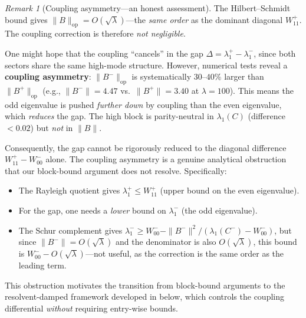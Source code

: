 \documentclass[12pt,a4paper]{article}
\theoremstyle{definition}
\theoremstyle{remark}
\newtheorem{remark}[theorem]{Remark}
\begin{document}
\begin{remark}[Coupling asymmetry---an honest assessment]
\label{rem:coupling-revisited}
The Hilbert--Schmidt bound gives $\|B\|_{\mathrm{op}} = O(\sqrt{\lambda})$---the \emph{same order} as the dominant diagonal $W_{11}^+$. The coupling correction is therefore \emph{not negligible}.

One might hope that the coupling ``cancels'' in the gap $\Delta = \lambda_1^+ - \lambda_1^-$, since both sectors share the same high-mode structure. However, numerical tests reveal a \textbf{coupling asymmetry}: $\|B^-\|_{\mathrm{op}}$ is systematically $30$--$40\%$ larger than $\|B^+\|_{\mathrm{op}}$ (e.g., $\|B^-\| = 4.47$ vs.\ $\|B^+\| = 3.40$ at $\lambda = 100$). This means the odd eigenvalue is pushed \emph{further down} by coupling than the even eigenvalue, which \emph{reduces} the gap. The high block is parity-neutral in $\lambda_1(C)$ (difference $< 0.02$) but \emph{not} in $\|B\|$.

Consequently, the gap cannot be rigorously reduced to the diagonal difference $W_{11}^+ - W_{00}^-$ alone. The coupling asymmetry is a genuine analytical obstruction that our block-bound argument does not resolve. Specifically:
\begin{itemize}
  \item The Rayleigh quotient gives $\lambda_1^+ \leq W_{11}^+$ (upper bound on the even eigenvalue).
  \item For the gap, one needs a \emph{lower} bound on $\lambda_1^-$ (the odd eigenvalue).
  \item The Schur complement gives $\lambda_1^- \geq W_{00}^- - \|B^-\|^2/(\lambda_1(C^-) - W_{00}^-)$, but since $\|B^-\| = O(\sqrt{\lambda})$ and the denominator is also $O(\sqrt{\lambda})$, this bound is $W_{00}^- - O(\sqrt{\lambda})$---not useful, as the correction is the same order as the leading term.
\end{itemize}
This obstruction motivates the transition from block-bound arguments to the resolvent-damped framework developed in  below, which controls the coupling differential \emph{without} requiring entry-wise bounds.
\end{remark}
\end{document}
